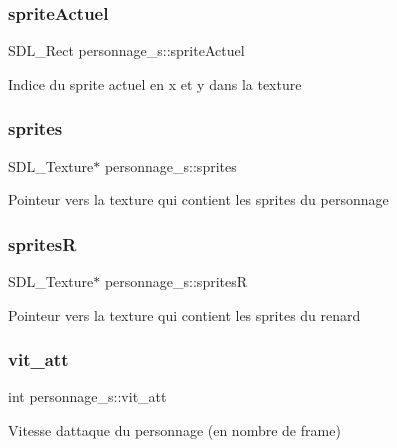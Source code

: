 \subsubsection{\texorpdfstring{sprite\+Actuel}{spriteActuel}}
{\footnotesize\ttfamily S\+D\+L\+\_\+\+Rect personnage\+\_\+s\+::sprite\+Actuel}

Indice du sprite actuel en x et y dans la texture \mbox{\label{structpersonnage__s_a97da32596524755cba3ba76782ab0205}} 
\subsubsection{\texorpdfstring{sprites}{sprites}}
{\footnotesize\ttfamily S\+D\+L\+\_\+\+Texture$\ast$ personnage\+\_\+s\+::sprites}

Pointeur vers la texture qui contient les sprites du personnage \mbox{\label{structpersonnage__s_a15f9d1c9ce3e18fc10bb0ef94b38cc07}} 
\subsubsection{\texorpdfstring{spritesR}{spritesR}}
{\footnotesize\ttfamily S\+D\+L\+\_\+\+Texture$\ast$ personnage\+\_\+s\+::spritesR}

Pointeur vers la texture qui contient les sprites du renard \mbox{\label{structpersonnage__s_a0022973bab638a02774a19710cedcd17}} 
\subsubsection{\texorpdfstring{vit\+\_\+att}{vit\_att}}
{\footnotesize\ttfamily int personnage\+\_\+s\+::vit\+\_\+att}

Vitesse d\textquotesingle{}attaque du personnage (en nombre de frame) \mbox{\label{structpersonnage__s_a8e340f828bfffa2c47269e315609ed01}} 
